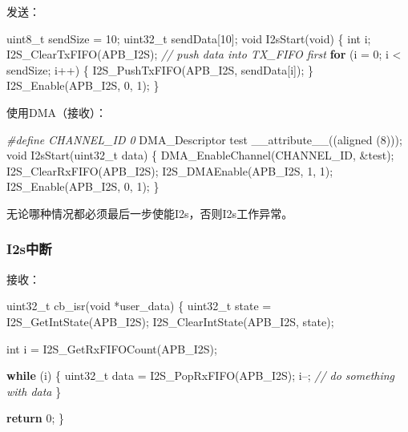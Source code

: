 \documentclass[
  12pt,
]{book}
\newenvironment{Shaded}{\begin{snugshade}}{\end{snugshade}}
\newcommand{\CommentTok}[1]{\textcolor[rgb]{0.56,0.35,0.01}{\textit{#1}}}
\newcommand{\ControlFlowTok}[1]{\textcolor[rgb]{0.13,0.29,0.53}{\textbf{#1}}}
\newcommand{\DataTypeTok}[1]{\textcolor[rgb]{0.13,0.29,0.53}{#1}}
\newcommand{\DecValTok}[1]{\textcolor[rgb]{0.00,0.00,0.81}{#1}}
\newcommand{\NormalTok}[1]{#1}
\newcommand{\PreprocessorTok}[1]{\textcolor[rgb]{0.56,0.35,0.01}{\textit{#1}}}
\begin{document}
发送：

\begin{Shaded}
\begin{Highlighting}[]
\DataTypeTok{uint8_t}\NormalTok{  sendSize = }\DecValTok{10}\NormalTok{;}
\DataTypeTok{uint32_t}\NormalTok{ sendData[}\DecValTok{10}\NormalTok{];}
\DataTypeTok{void}\NormalTok{ I2sStart(}\DataTypeTok{void}\NormalTok{)}
\NormalTok{\{}
    \DataTypeTok{int}\NormalTok{ i; }
\NormalTok{    I2S_ClearTxFIFO(APB_I2S);}
    \CommentTok{// push data into TX_FIFO first}
    \ControlFlowTok{for}\NormalTok{ (i = }\DecValTok{0}\NormalTok{; i < sendSize; i++) \{}
\NormalTok{        I2S_PushTxFIFO(APB_I2S, sendData[i]);}
\NormalTok{    \}}
\NormalTok{    I2S_Enable(APB_I2S, }\DecValTok{0}\NormalTok{, }\DecValTok{1}\NormalTok{);}
\NormalTok{\}}
\end{Highlighting}
\end{Shaded}

使用DMA（接收）：

\begin{Shaded}
\begin{Highlighting}[]
\PreprocessorTok{#define CHANNEL_ID  0}
\NormalTok{DMA_Descriptor test __attribute__((aligned (}\DecValTok{8}\NormalTok{)));                                }
\DataTypeTok{void}\NormalTok{ I2sStart(}\DataTypeTok{uint32_t}\NormalTok{ data)}
\NormalTok{\{}
\NormalTok{   DMA_EnableChannel(CHANNEL_ID, &test);}
\NormalTok{   I2S_ClearRxFIFO(APB_I2S);}
\NormalTok{   I2S_DMAEnable(APB_I2S, }\DecValTok{1}\NormalTok{, }\DecValTok{1}\NormalTok{);    }
\NormalTok{   I2S_Enable(APB_I2S, }\DecValTok{0}\NormalTok{, }\DecValTok{1}\NormalTok{);}
\NormalTok{\}}
\end{Highlighting}
\end{Shaded}

无论哪种情况都必须最后一步使能I2s，否则I2s工作异常。

\hypertarget{i2sux4e2dux65ad}{%
\subsubsection{I2s中断}\label{i2sux4e2dux65ad}}

接收：

\begin{Shaded}
\begin{Highlighting}[]
\DataTypeTok{uint32_t}\NormalTok{ cb_isr(}\DataTypeTok{void}\NormalTok{ *user_data)}
\NormalTok{\{ }
    \DataTypeTok{uint32_t}\NormalTok{ state = I2S_GetIntState(APB_I2S);}
\NormalTok{    I2S_ClearIntState(APB_I2S, state);}

    \DataTypeTok{int}\NormalTok{ i = I2S_GetRxFIFOCount(APB_I2S);}

    \ControlFlowTok{while}\NormalTok{ (i) \{}
        \DataTypeTok{uint32_t}\NormalTok{ data = I2S_PopRxFIFO(APB_I2S);}
\NormalTok{        i--;}
        \CommentTok{// do something with data}
\NormalTok{    \}}

    \ControlFlowTok{return} \DecValTok{0}\NormalTok{;}
\NormalTok{\}}
\end{Highlighting}
\end{Shaded}
\end{document}
